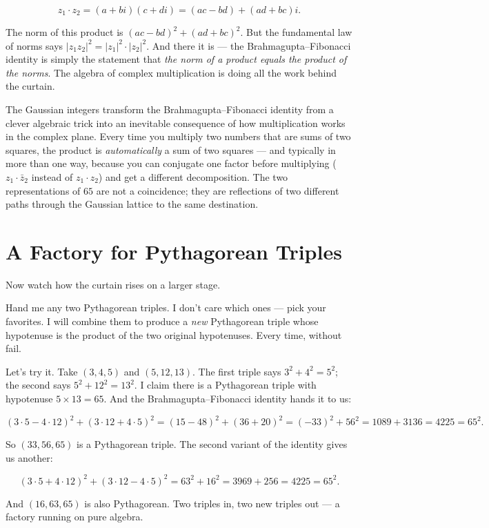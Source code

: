\documentclass[11pt,twoside,openright]{book}
\theoremstyle{definition}
\theoremstyle{remark}
\begin{document}
\[z_1 \cdot z_2 = (a + bi)(c + di) = (ac - bd) + (ad + bc)i.\]

The norm of this product is $(ac - bd)^2 + (ad + bc)^2$. But the fundamental law of norms says $|z_1 z_2|^2 = |z_1|^2 \cdot |z_2|^2$. And there it is --- the Brahmagupta--Fibonacci identity is simply the statement that \textit{the norm of a product equals the product of the norms}. The algebra of complex multiplication is doing all the work behind the curtain.


The Gaussian integers transform the Brahmagupta--Fibonacci identity from a clever algebraic trick into an inevitable consequence of how multiplication works in the complex plane. Every time you multiply two numbers that are sums of two squares, the product is \textit{automatically} a sum of two squares --- and typically in more than one way, because you can conjugate one factor before multiplying ($z_1 \cdot \bar{z}_2$ instead of $z_1 \cdot z_2$) and get a different decomposition. The two representations of $65$ are not a coincidence; they are reflections of two different paths through the Gaussian lattice to the same destination.


\section{A Factory for Pythagorean Triples}

Now watch how the curtain rises on a larger stage.

Hand me any two Pythagorean triples. I don't care which ones --- pick your favorites. I will combine them to produce a \textit{new} Pythagorean triple whose hypotenuse is the product of the two original hypotenuses. Every time, without fail.

Let's try it. Take $(3, 4, 5)$ and $(5, 12, 13)$. The first triple says $3^2 + 4^2 = 5^2$; the second says $5^2 + 12^2 = 13^2$. I claim there is a Pythagorean triple with hypotenuse $5 \times 13 = 65$. And the Brahmagupta--Fibonacci identity hands it to us:

\[(3 \cdot 5 - 4 \cdot 12)^2 + (3 \cdot 12 + 4 \cdot 5)^2 = (15 - 48)^2 + (36 + 20)^2 = (-33)^2 + 56^2 = 1089 + 3136 = 4225 = 65^2.\]

So $(33, 56, 65)$ is a Pythagorean triple. The second variant of the identity gives us another:

\[(3 \cdot 5 + 4 \cdot 12)^2 + (3 \cdot 12 - 4 \cdot 5)^2 = 63^2 + 16^2 = 3969 + 256 = 4225 = 65^2.\]

And $(16, 63, 65)$ is also Pythagorean. Two triples in, two new triples out --- a factory running on pure algebra.
\end{document}
